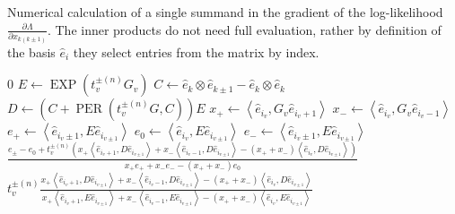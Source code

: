\begin{algorithm}[!ht]
	\caption[Single summand of $\frac{\partial \Lambda}{\partial x_{k\left(k \pm 1\right)}}$]{Numerical calculation of a single summand in the gradient of the log-likelihood $\frac{\partial \Lambda}{\partial x_{k\left(k \pm 1\right)}}$. The inner products do not need full evaluation, rather by definition of the basis $\hat{e}_i$ they select entries from the matrix by index.}
	\label{alg:singlesummand}
	\begin{algorithmic}[1]
				\State \Return $0$
			\EndIf
			\State $E \gets \operatorname{EXP}\left(t_v^{\pm \left(n\right)} G_v\right)$
			\State $C \gets \hat{e}_k \otimes \hat{e}_{k \pm 1} - \hat{e}_k \otimes \hat{e}_k$
			\State $D \gets \left(C + \operatorname{PER}\left(t_v^{\pm \left(n\right)} G, C\right)\right)E$
			\State $x_{+} \gets \left\langle \hat{e}_{i_v} , G_v \hat{e}_{i_v+1} \right\rangle$
			\State $x_{-} \gets \left\langle \hat{e}_{i_v} , G_v \hat{e}_{i_v-1} \right\rangle$
				\State $e_{+} \gets \left\langle \hat{e}_{i_v \pm 1}, E \hat{e}_{i_{v \pm 1}} \right\rangle$
				\State $e_0 \gets \left\langle \hat{e}_{i_v}, E \hat{e}_{i_{v \pm 1}} \right\rangle$
				\State $e_{-} \gets \left\langle \hat{e}_{i_v \pm 1}, E \hat{e}_{i_{v \pm 1}} \right\rangle$
				\State \Return $\frac{e_\pm - e_0 + t_v^{\pm \left(n\right)} \left(x_{+} \left\langle \hat{e}_{i_v + 1}, D \hat{e}_{i_{v \pm 1}} \right\rangle + x_{-} \left\langle \hat{e}_{i_v-1}, D \hat{e}_{i_{v \pm 1}} \right\rangle - \left(x_{+} + x_{-} \right) \left\langle \hat{e}_{i_v}, D \hat{e}_{i_{v \pm 1}} \right\rangle\right)}{x_{+} e_{+} + x_{-}e_{-} - \left(x_{+} + x_{-} \right) e_0}$
			\EndIf
			\State \Return $t_v^{\pm \left(n\right)} \frac{ x_{+} \left\langle \hat{e}_{i_v + 1}, D \hat{e}_{i_{v \pm 1}} \right\rangle + x_{-} \left\langle \hat{e}_{i_v-1}, D \hat{e}_{i_{v \pm 1}} \right\rangle - \left(x_{+} + x_{-} \right) \left\langle \hat{e}_{i_v}, D \hat{e}_{i_{v \pm 1}} \right\rangle}{x_{+} \left\langle \hat{e}_{i_v + 1}, E \hat{e}_{i_{v \pm 1}} \right\rangle + x_{-} \left\langle \hat{e}_{i_v - 1}, E \hat{e}_{i_{v \pm 1}} \right\rangle - \left(x_{+} + x_{-} \right) \left\langle \hat{e}_{i_v}, E \hat{e}_{i_{v \pm 1}} \right\rangle}$
		\EndFunction
	\end{algorithmic}
\end{algorithm}

